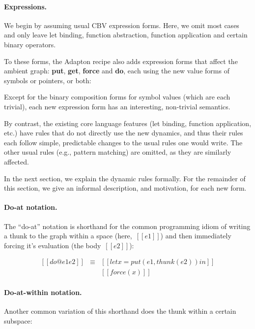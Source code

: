 \documentclass[11pt]{article}
\begin{document}
\paragraph{Expressions.}

We begin by assuming usual CBV expression forms.  Here, we omit most
cases and only leave let binding, function abstraction, function
application and certain binary operators.

To these forms, the Adapton recipe also adds expression forms that
affect the ambient graph: \textbf{put}, \textbf{get}, \textbf{force}
and \textbf{do}, each using the new value forms of symbols or
pointers, or both:

\ottgrammartabular{
  \otte
}

Except for the binary composition forms for symbol values (which are
each trivial), each new expression form has an interesting,
non-trivial semantics.

By contrast, the existing core language features (let binding,
function application, etc.) have rules that do not directly use the
new dynamics, and thus their rules each follow simple, predictable
changes to the usual rules one would write.
%
The other usual rules (e.g., pattern matching) are omitted, as they
are similarly affected.

In the next section, we explain the dynamic rules formally.
%
For the remainder of this section, we give an informal description,
and motivation, for each new form.

\paragraph{Do-at notation.}

The ``do-at'' notation is shorthand for the common programming idiom
of writing a thunk to the graph within a space (here,~$[[e1]]$) and then
immediately forcing it's evaluation (the body~$[[e2]]$):

\[
\begin{array}{lcl}
  [[do @e1 { e2 }]]
  &\equiv&
  [[let x = put(e1, thunk(e2)) in]]
  \\
  &&[[force(x)]]
\end{array}
\]

\paragraph{Do-at-within notation.}
Another common variation of this shorthand does the thunk within a
certain subspace:
\end{document}
